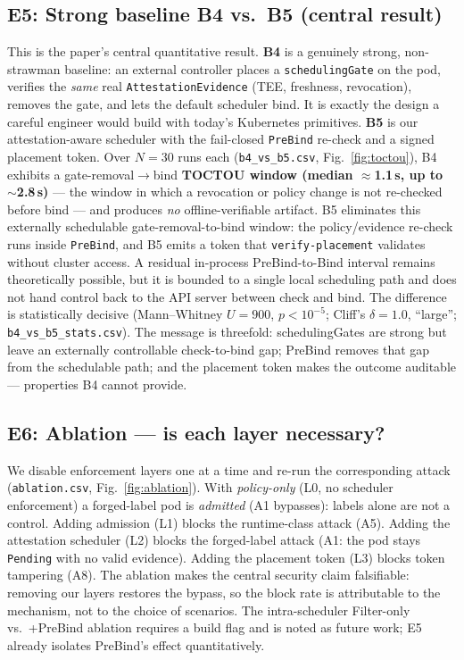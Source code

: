 \subsection{E5: Strong baseline B4 vs.\ B5 (central result)}
\label{sec:e4}
This is the paper's central quantitative result. \textbf{B4} is a genuinely
strong, non-strawman baseline: an external controller places a
\texttt{schedulingGate} on the pod, verifies the \emph{same} real
\texttt{AttestationEvidence} (TEE, freshness, revocation), removes the gate, and
lets the default scheduler bind. It is exactly the design a careful engineer
would build with today's Kubernetes primitives. \textbf{B5} is our
attestation-aware scheduler with the fail-closed \texttt{PreBind} re-check and a
signed placement token. Over $N{=}30$ runs each (\texttt{b4\_vs\_b5.csv},
Fig.~\ref{fig:toctou}), B4 exhibits a gate-removal$\to$bind \textbf{TOCTOU window
(median $\approx$1.1\,s, up to $\sim$2.8\,s)} --- the window in which a revocation
or policy change is not re-checked before bind --- and produces \emph{no}
offline-verifiable artifact. B5 eliminates this externally schedulable
gate-removal-to-bind window: the policy/evidence re-check runs inside
\texttt{PreBind}, and B5 emits a token that \texttt{verify-placement} validates
without cluster access. A residual in-process PreBind-to-Bind interval remains
theoretically possible, but it is bounded to a single local scheduling path and
does not hand control back to the API server between check and bind. The
difference is statistically decisive (Mann--Whitney $U{=}900$, $p<10^{-5}$;
Cliff's $\delta{=}1.0$, ``large''; \texttt{b4\_vs\_b5\_stats.csv}). The message is
threefold: schedulingGates are strong but leave an externally controllable
check-to-bind gap; PreBind removes that gap from the schedulable path; and the
placement token makes the outcome auditable --- properties B4 cannot provide.

\subsection{E6: Ablation --- is each layer necessary?}
\label{sec:e5}
We disable enforcement layers one at a time and re-run the corresponding attack
(\texttt{ablation.csv}, Fig.~\ref{fig:ablation}). With \emph{policy-only} (L0, no
scheduler enforcement) a forged-label pod is \emph{admitted} (A1 bypasses):
labels alone are not a control. Adding admission (L1) blocks the runtime-class
attack (A5). Adding the attestation scheduler (L2) blocks the forged-label attack
(A1: the pod stays \texttt{Pending} with no valid evidence). Adding the placement
token (L3) blocks token tampering (A8). The ablation makes the central security
claim falsifiable: removing our layers restores the bypass, so the block rate is
attributable to the mechanism, not to the choice of scenarios. The
intra-scheduler Filter-only vs.\ +PreBind ablation requires a build flag and is
noted as future work; E5 already isolates PreBind's effect quantitatively.

